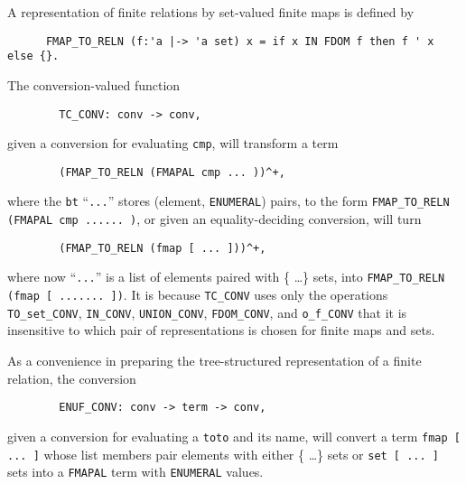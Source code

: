 A representation of finite relations by set-valued finite maps is defined by
\begin{verbatim}
      FMAP_TO_RELN (f:'a |-> 'a set) x = if x IN FDOM f then f ' x else {}.
\end{verbatim}
The conversion-valued function
\begin{verbatim}
        TC_CONV: conv -> conv,
\end{verbatim}
given a conversion for evaluating {\tt cmp}, will transform a term
\begin{verbatim}
        (FMAP_TO_RELN (FMAPAL cmp ... ))^+,
\end{verbatim}
where the {\tt bt} ``{\tt...}''
stores (element, {\tt ENUMERAL}) pairs, to the form
{\tt FMAP_TO_RELN (FMAPAL cmp ......\ )}, or given an equality-deciding
conversion, will turn
\begin{verbatim}
        (FMAP_TO_RELN (fmap [ ... ]))^+,
\end{verbatim}
where now ``{\tt...}''
is a list of elements paired with \{ \dots \} sets, into
{\tt FMAP_TO_RELN (fmap [ .......\ ])}. It is because {\tt TC_CONV} uses
only the operations {\tt TO_set_CONV}, {\tt IN_CONV}, {\tt UNION_CONV},
{\tt FDOM_CONV}, and {\tt o_f_CONV} that it is insensitive to which pair of
representations is chosen for finite maps and sets.

As a convenience in preparing the tree-structured
representation of a finite relation, the conversion
\begin{verbatim}
        ENUF_CONV: conv -> term -> conv,
\end{verbatim}
given a conversion for evaluating a {\tt toto} and its name, will convert
a term {\tt fmap [ ...\ ]} whose list members pair elements with
either \{ \dots \} sets or {\tt set [ ...\ ]} sets into a {\tt FMAPAL} term
with {\tt ENUMERAL} values.

